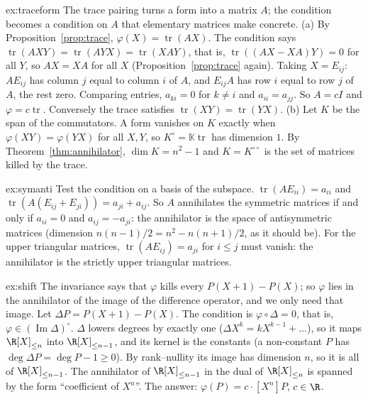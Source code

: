 \begin{solution}{ex:traceform}
\idea The trace pairing turns a form into a matrix $A$; the condition becomes a condition on $A$ that elementary
matrices make concrete.
\writeup (a) By Proposition~\ref{prop:trace}, $\varphi(X)=\operatorname{tr}(AX)$. The condition says
$\operatorname{tr}(AXY)=\operatorname{tr}(AYX)=\operatorname{tr}(XAY)$, that is, $\operatorname{tr}((AX-XA)Y)=0$ for all $Y$, so
$AX=XA$ for all $X$ (Proposition~\ref{prop:trace} again). Taking $X=E_{ij}$: $AE_{ij}$ has column $j$ equal to column $i$ of
$A$, and $E_{ij}A$ has row $i$ equal to row $j$ of $A$, the rest zero. Comparing entries, $a_{ki}=0$ for $k\ne i$ and
$a_{ii}=a_{jj}$. So $A=cI$ and $\varphi=c\operatorname{tr}$. Conversely the trace satisfies $\operatorname{tr}(XY)=\operatorname{tr}(YX)$.
(b) Let $K$ be the span of the commutators. A form vanishes on $K$ exactly when $\varphi(XY)=\varphi(YX)$ for all $X,Y$, so
$K^\circ=\mathbb K\operatorname{tr}$ has dimension $1$. By Theorem~\ref{thm:annihilator}, $\dim K=n^2-1$ and $K=K^{\circ\circ}$
is the set of matrices killed by the trace.
\end{solution}

\begin{solution}{ex:symanti}
\idea Test the condition on a basis of the subspace.
\writeup $\operatorname{tr}(AE_{ii})=a_{ii}$ and $\operatorname{tr}(A(E_{ij}+E_{ji}))=a_{ji}+a_{ij}$. So $A$ annihilates the
symmetric matrices if and only if $a_{ii}=0$ and $a_{ij}=-a_{ji}$: the annihilator is the space of antisymmetric
matrices (dimension $n(n-1)/2=n^2-n(n+1)/2$, as it should be). For the upper triangular matrices,
$\operatorname{tr}(AE_{ij})=a_{ji}$ for $i\le j$ must vanish: the annihilator is the strictly upper triangular matrices.
\end{solution}

\begin{solution}{ex:shift}
\idea The invariance says that $\varphi$ kills every $P(X+1)-P(X)$; so $\varphi$ lies in the annihilator of the image of
the difference operator, and we only need that image.
\writeup Let $\Delta P=P(X+1)-P(X)$. The condition is $\varphi\circ\Delta=0$, that is, $\varphi\in(\operatorname{Im}\Delta)^\circ$.
$\Delta$ lowers degrees by exactly one ($\Delta X^k=kX^{k-1}+\dots$), so it maps $\R[X]_{\le n}$ into $\R[X]_{\le n-1}$, and
its kernel is the constants (a non-constant $P$ has $\deg\Delta P=\deg P-1\ge0$). By rank--nullity its image has dimension
$n$, so it is all of $\R[X]_{\le n-1}$. The annihilator of $\R[X]_{\le n-1}$ in the dual of $\R[X]_{\le n}$ is spanned by
the form ``coefficient of $X^n$''. The answer: $\varphi(P)=c\cdot[X^n]P$, $c\in\R$.
\end{solution}

